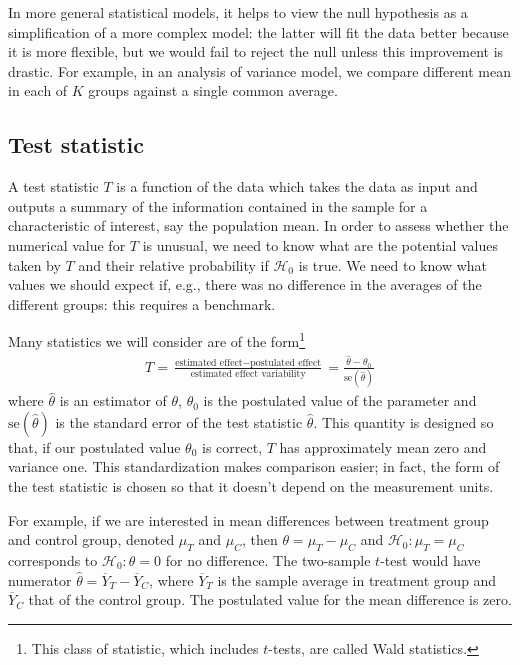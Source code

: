 \documentclass[
  11pt,
  letterpaper,
]{scrbook}
\theoremstyle{definition}
\theoremstyle{remark}
\begin{document}
In more general statistical models, it helps to view the null hypothesis
as a simplification of a more complex model: the latter will fit the
data better because it is more flexible, but we would fail to reject the
null unless this improvement is drastic. For example, in an analysis of
variance model, we compare different mean in each of \(K\) groups
against a single common average.

\hypertarget{test-statistic}{%
\subsection{Test statistic}\label{test-statistic}}

A test statistic \(T\) is a function of the data which takes the data as
input and outputs a summary of the information contained in the sample
for a characteristic of interest, say the population mean. In order to
assess whether the numerical value for \(T\) is unusual, we need to know
what are the potential values taken by \(T\) and their relative
probability if \(\mathscr{H}_0\) is true. We need to know what values we
should expect if, e.g., there was no difference in the averages of the
different groups: this requires a benchmark.

Many statistics we will consider are of the form\footnote{This class of
  statistic, which includes \(t\)-tests, are called Wald statistics.}
\begin{align*}
T = \frac{\text{estimated effect}- \text{postulated effect}}{\text{estimated effect variability}} = \frac{\widehat{\theta} - \theta_0}{\mathrm{se}(\widehat{\theta})}
\end{align*} where \(\widehat{\theta}\) is an estimator of \(\theta\),
\(\theta_0\) is the postulated value of the parameter and
\(\mathrm{se}(\widehat{\theta})\) is the standard error of the test
statistic \(\widehat{\theta}\). This quantity is designed so that, if
our postulated value \(\theta_0\) is correct, \(T\) has approximately
mean zero and variance one. This standardization makes comparison
easier; in fact, the form of the test statistic is chosen so that it
doesn't depend on the measurement units.

For example, if we are interested in mean differences between treatment
group and control group, denoted \(\mu_T\) and \(\mu_C\), then
\(\theta = \mu_T-\mu_C\) and \(\mathscr{H}_0: \mu_T = \mu_C\)
corresponds to \(\mathscr{H}_0: \theta = 0\) for no difference. The
two-sample \(t\)-test would have numerator
\(\widehat{\theta} = \overline{Y}_T - \overline{Y}_C\), where
\(\overline{Y}_T\) is the sample average in treatment group and
\(\overline{Y}_C\) that of the control group. The postulated value for
the mean difference is zero.
\end{document}
